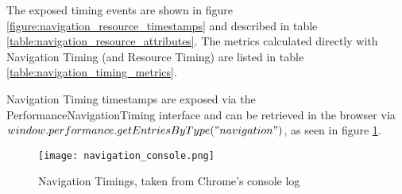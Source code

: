 The exposed timing events are shown in figure \ref{figure:navigation_resource_timestamps} and described in table \ref{table:navigation_resource_attributes}.
The metrics calculated directly with Navigation Timing (and Resource Timing) are listed in table \ref{table:navigation_timing_metrics}.


Navigation Timing timestamps are exposed via the PerformanceNavigationTiming interface and can be retrieved in the browser via $window.performance.getEntriesByType("navigation")$, as seen in figure \ref{figure:navigation_console}. %




\begin{figure}[h!]
\begin{center}
\texttt{[image: navigation\_console.png]}
\caption{Navigation Timings, taken from Chrome's console log}
\label{figure:navigation_console}
\end{center}
\end{figure}




